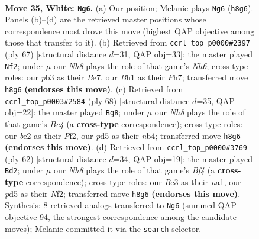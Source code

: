 \documentclass[11pt]{article}
\begin{document}
\clearpage

\begin{figure}[p]\centering
\begin{subfigure}{0.46\textwidth}\centering
\resizebox{\linewidth}{!}{%
\newchessgame
\chessboard[
  setfen={6kN/8/8/3p1p2/2p2P2/1pB2n2/1P2b3/1K5B w - - 6 35},
  showmover=false,
  pgfstyle=straightmove, color=movearrow, markmove={h8-g6}
]}
\caption{}
\end{subfigure}\hfill
\begin{subfigure}{0.46\textwidth}\centering
\resizebox{\linewidth}{!}{%
\newchessgame
\chessboard[
  setfen={5k2/1b2b2p/6p1/BNp5/P1B5/1P5n/6PK/8 b - - 2 34},
  showmover=false,
  pgfstyle=straightmove, color=movearrow, markmove={h3-f2}
]}
\caption{}
\end{subfigure}
\\[4pt]
\begin{subfigure}{0.46\textwidth}\centering
\resizebox{\linewidth}{!}{%
\newchessgame
\chessboard[
  setfen={b7/7p/2pN2p1/2P5/1nBk1p1P/8/4KPP1/8 w - - 1 35},
  showmover=false,
  pgfstyle=straightmove, color=movearrow, markmove={c4-g8}
]}
\caption{}
\end{subfigure}\hfill
\begin{subfigure}{0.46\textwidth}\centering
\resizebox{\linewidth}{!}{%
\newchessgame
\chessboard[
  setfen={8/4b2p/6p1/5k2/1pK2B2/8/1P3NPP/n7 w - - 0 32},
  showmover=false,
  pgfstyle=straightmove, color=movearrow, markmove={f4-d2}
]}
\caption{}
\end{subfigure}
\caption{\textbf{Move 35, White: \texttt{Ng6}.} (a) Our position; Melanie plays \texttt{Ng6} (\texttt{h8g6}). Panels (b)--(d) are the retrieved master positions whose correspondence most drove this move (highest QAP objective among those that transfer to it). (b) Retrieved from \texttt{ccrl\_top\_p0000\#2397} (ply 67) [structural distance $d$=31, QAP obj=33]: the master played \texttt{Nf2}; under $\mu$ our \emph{Nh8} plays the role of that game's \emph{Nh6}; cross-type roles: our \emph{p}b3 as their \emph{B}e7, our \emph{B}h1 as their \emph{P}h7; transferred move \texttt{h8g6} \textbf{(endorses this move)}. (c) Retrieved from \texttt{ccrl\_top\_p0003\#2584} (ply 68) [structural distance $d$=35, QAP obj=22]: the master played \texttt{Bg8}; under $\mu$ our \emph{Nh8} plays the role of that game's \emph{Bc4} (a \textbf{cross-type} correspondence); cross-type roles: our \emph{b}e2 as their \emph{P}f2, our \emph{p}d5 as their \emph{n}b4; transferred move \texttt{h8g6} \textbf{(endorses this move)}. (d) Retrieved from \texttt{ccrl\_top\_p0000\#3769} (ply 62) [structural distance $d$=34, QAP obj=19]: the master played \texttt{Bd2}; under $\mu$ our \emph{Nh8} plays the role of that game's \emph{Bf4} (a \textbf{cross-type} correspondence); cross-type roles: our \emph{B}c3 as their \emph{n}a1, our \emph{p}d5 as their \emph{N}f2; transferred move \texttt{h8g6} \textbf{(endorses this move)}. Synthesis: 8 retrieved analogs transferred to \texttt{Ng6} (summed QAP objective 94, the strongest correspondence among the candidate moves); Melanie committed it via the \texttt{search} selector.}
\label{fig:thought-m68}
\end{figure}
\end{document}
